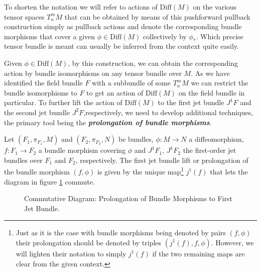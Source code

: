 To shorten the notation we will refer to actions of $\mathrm{Diff}(M)$ on the various tensor spaces $T^m_nM$ that can be obtained by means of this pushforward pullback construction simply as pullback actions and denote the corresponding bundle morphisms that cover a given $\phi \in \mathrm{Diff}(M)$ collectively by $\phi_{\ast}$. Which precise tensor bundle is meant can usually be inferred from the context quite easily.

Given $\phi \in \mathrm{Diff}(M)$, by this construction, we can obtain the corresponding action by bundle isomorphisms on any tensor bundle over $M$. As we have identified the field bundle $F$ with a subbundle of some $T^m_nM$ we can restrict the bundle isomorphisms to $F$ to get an action of $\mathrm{Diff}(M)$ on the field bundle in particular. 
To further lift the action of $\mathrm{Diff}(M)$ to the first jet bundle $J^1F$ and the second jet bundle $J^2F$,respectively, we need to develop additional techniques, the primary tool being the \textbf{\textit{prolongation of bundle morphisms}}. 
\begin{definition}
Let $(F_1,\pi_{F_1},M)$ and $(F_2,\pi_{F_2},N)$ be bundles, $\phi : M \rightarrow N$ a diffeomorphism, $f : F_1 \rightarrow F_2$ a bundle morphism covering $\phi$ and $J^1F_1$, $J^1F_2$ the first-order jet bundles over $F_1$ and $F_2$, respectively. The first jet bundle lift or prolongation of the bundle morphism $(f,\phi)$ is given by the unique map\footnote{Just as it is the case with bundle morphisms being denoted by pairs $(f,\phi)$ their prolongation should be denoted by triples $(j^1(f),f,\phi)$. However, we will lighten their notation to simply $j^1(f)$ if the two remaining maps are clear from the given context.} $j^1(f)$ that lets the diagram in figure \ref{ProlongMorph} commute.
\begin{figure}[hbt!]
\centering
{}
\caption{Commutative Diagram: Prolongation of Bundle Morphisms to First Jet Bundle.}\label{ProlongMorph}
\end{figure}
\end{definition}
